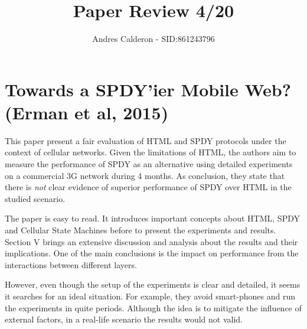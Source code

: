 \documentclass[a4paper,10pt]{scrartcl}
\title{Paper Review 4/20}
\author{Andres Calderon - SID:861243796}
\begin{document}
\maketitle
\thispagestyle{empty}

\section*{Towards a SPDY'ier Mobile Web? (Erman et al, 2015)}
This paper present a fair evaluation of HTML and SPDY protocols under the context of cellular networks.  Given the limitations of HTML, the authors aim to measure the performance of SPDY as an alternative using detailed experiments on a commercial 3G network during 4 months.  As conclusion, they state that there is \textit{not} clear evidence of superior performance of SPDY over HTML in the studied scenario.

The paper is easy to read.  It introduces important concepts about HTML, SPDY and Cellular State Machines before to present the experiments and results.  Section V brings an extensive discussion and analysis about the results and their implications.  One of the main conclusions is the impact on performance from the interactions between different layers.  

However, even though the setup of the experiments is clear and detailed, it seems it searches for an ideal situation.  For example, they avoid smart-phones and run the experiments in quite periods.  Although the idea is to mitigate the influence of external factors, in a real-life scenario the results would not valid. 

\end{document}
